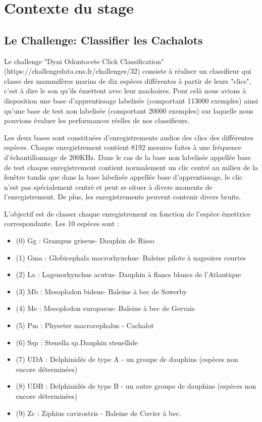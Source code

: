 \hypertarget{Contexte}{%
\section{Contexte du stage}\label{Contexte}}

\hypertarget{Le-Challenge}{%
\subsection{Le Challenge: Classifier les Cachalots}\label{Le-Challenge}}

Le challenge "Dyni Odontocete Click Classification" (https://challengedata.ens.fr/challenges/32) consiste à réaliser un classifieur qui classe des mammifères marins de dix espèces différentes à partir de leurs "clics", c'est à dire le son qu'ils émettent avec leur machoires.
Pour celà nous avions à disposition une base d'apprentissage labelisée (comportant 113000 exemples) ainsi qu'une base de test non labelisée (comportant 20000 exemples) sur laquelle nous pouvions évaluer les performances réelles de nos classifieurs.

Les deux bases sont constituées d'enregistrements audios des clics des différentes espèces. Chaque enregistrement contient 8192 mesures faites à une fréquence d'échantillonnage de 200KHz. Dans le cas de la base non labelisée appellée base de test chaque enregistrement contient normalement un clic centré au milieu de la fenêtre tandis que dans la base labelisée appellée base d'apprentissage, le clic n'est pas spécialement centré et peut se situer à divers moments de l'enregistrement. De plus, les enregistrements peuvent contenir divers bruits.

L'objectif est de classer chaque enregistrement en fonction de l'espèce émettrice correspondante. Les 10 espèces sont :
\begin{itemize}
\item (0) Gg : Grampus griseus- Dauphin de Risso
\item (1) Gma : Globicephala macrorhynchus- Baleine pilote à nageoires courtes
\item (2) La : Lagenorhynchus acutus- Dauphin à flancs blancs de l'Atlantique
\item (3) Mb : Mesoplodon bidens- Baleine à bec de Sowerby
\item (4) Me : Mesoplodon europaeus- Baleine à bec de Gervais
\item (5) Pm : Physeter macrocephalus - Cachalot
\item (6) Ssp : Stenella sp.Dauphin stenellide
\item (7) UDA : Delphinidés de type A - un groupe de dauphins (espèces non encore déterminées)
\item (8) UDB : Delphinidés de type B - un autre groupe de dauphins (espèces non encore déterminées)
\item (9) Zc : Ziphius cavirostris - Baleine de Cuvier à bec.
\end{itemize}


